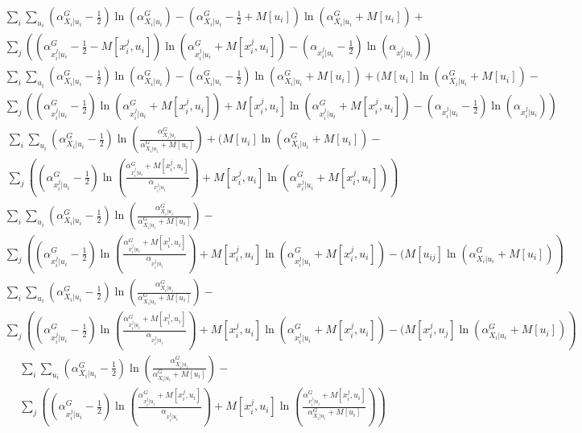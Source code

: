 \documentclass[11pt,a4paper]{article}
\begin{document}
\begin{enumerate}
\begin{multline*}
\sum_i \sum_{u_i} (\alpha_{X_i|u_i}^G - \frac{1}{2}) \ln (\alpha_{X_i|u_i}^G ) - (\alpha_{X_i|u_i}^G  -  \frac{1}{2} + M[u_i])\ln(\alpha_{X_i|u_i}^G  + M[u_i] ) + \\ \sum_j \left( (\alpha_{x_i^j|u_i}^G - \frac{1}{2} -  M[x_i^j,u_i]) \ln(\alpha_{x_i^j|u_i}^G + M[x_i^j,u_i]) - (\alpha_{x_i^j|u_i} - \frac{1}{2})\ln(\alpha_{x_i^j|u_i}) \right)
\end{multline*}
\begin{multline*}
\sum_i \sum_{u_i} (\alpha_{X_i|u_i}^G - \frac{1}{2}) \ln (\alpha_{X_i|u_i}^G ) - (\alpha_{X_i|u_i}^G  -  \frac{1}{2}) \ln(\alpha_{X_i|u_i}^G  + M[u_i] )   + (M[u_i] \ln(\alpha_{X_i|u_i}^G  + M[u_i] ) - \\ \sum_j \left( (\alpha_{x_i^j|u_i}^G - \frac{1}{2}) \ln(\alpha_{x_i^j|u_i}^G + M[x_i^j,u_i]) + M[x_i^j,u_i] \ln(\alpha_{x_i^j|u_i}^G + M[x_i^j,u_i])  - (\alpha_{x_i^j|u_i} - \frac{1}{2})\ln(\alpha_{x_i^j|u_i}) \right)
\end{multline*}
\begin{multline*}
\sum_i \sum_{u_i} (\alpha_{X_i|u_i}^G - \frac{1}{2}) \ln (\frac{\alpha_{X_i|u_i}^G }{\alpha_{X_i|u_i}^G  + M[u_i]})  + (M[u_i] \ln(\alpha_{X_i|u_i}^G  + M[u_i] ) - \\ \sum_j \left( (\alpha_{x_i^j|u_i}^G - \frac{1}{2}) \ln(\frac{\alpha_{x_i^j|u_i}^G + M[x_i^j,u_i]}{  \alpha_{x_i^j|u_i}}   ) + M[x_i^j,u_i] \ln(\alpha_{x_i^j|u_i}^G + M[x_i^j,u_i])  \right)
\end{multline*}
\begin{multline*}
\sum_i \sum_{u_i} (\alpha_{X_i|u_i}^G - \frac{1}{2}) \ln (\frac{\alpha_{X_i|u_i}^G }{\alpha_{X_i|u_i}^G  + M[u_i]}) - \\ \sum_j \left( (\alpha_{x_i^j|u_i}^G - \frac{1}{2}) \ln(\frac{\alpha_{x_i^j|u_i}^G + M[x_i^j,u_i]}{  \alpha_{x_i^j|u_i}}   ) + M[x_i^j,u_i] \ln(\alpha_{x_i^j|u_i}^G + M[x_i^j,u_i]) -  (M[u_{ij}] \ln(\alpha_{X_i|u_i}^G  + M[u_i] )  \right)
\end{multline*}
\begin{multline*}
\sum_i \sum_{u_i} (\alpha_{X_i|u_i}^G - \frac{1}{2}) \ln (\frac{\alpha_{X_i|u_i}^G }{\alpha_{X_i|u_i}^G  + M[u_i]}) - \\ \sum_j \left( (\alpha_{x_i^j|u_i}^G - \frac{1}{2}) \ln(\frac{\alpha_{x_i^j|u_i}^G + M[x_i^j,u_i]}{  \alpha_{x_i^j|u_i}}   ) + M[x_i^j,u_i] \ln(\alpha_{x_i^j|u_i}^G + M[x_i^j,u_i]) -  (M[x_i^j,u_j] \ln(\alpha_{X_i|u_i}^G  + M[u_i] )  \right)
\end{multline*}
\begin{multline*}
\sum_i \sum_{u_i} (\alpha_{X_i|u_i}^G - \frac{1}{2}) \ln (\frac{\alpha_{X_i|u_i}^G }{\alpha_{X_i|u_i}^G  + M[u_i]}) - \\ \sum_j \left( (\alpha_{x_i^j|u_i}^G - \frac{1}{2}) \ln(\frac{\alpha_{x_i^j|u_i}^G + M[x_i^j,u_i]}{  \alpha_{x_i^j|u_i}}   ) + M[x_i^j,u_i] \ln(\frac{\alpha_{x_i^j|u_i}^G + M[x_i^j,u_i]}{\alpha_{X_i|u_i}^G  + M[u_i]})  \right)
\end{multline*}


\end{enumerate}
\end{document}
